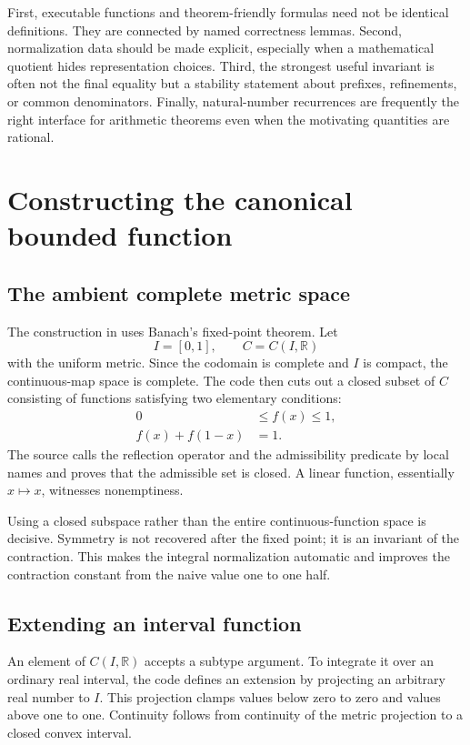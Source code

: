 \documentclass[11pt,oneside]{report}
\theoremstyle{definition}
\theoremstyle{remark}
\DeclareRobustCommand{\file}[1]{\texorpdfstring{\texttt{\expandafter\seqsplit\expandafter{\detokenize{#1}}}}{\detokenize{#1}}}
\newcommand{\R}{\mathbb{R}}
\begin{document}
First, executable functions and theorem-friendly formulas need not be identical definitions.  They are connected by named correctness lemmas.  Second, normalization data should be made explicit, especially when a mathematical quotient hides representation choices.  Third, the strongest useful invariant is often not the final equality but a stability statement about prefixes, refinements, or common denominators.  Finally, natural-number recurrences are frequently the right interface for arithmetic theorems even when the motivating quantities are rational.

\chapter{Constructing the canonical bounded function}\label{ch:existence}

\section{The ambient complete metric space}
The construction in \file{Existence.lean} uses Banach's fixed-point theorem.  Let
\[
  I=[0,1],
  \qquad
  C=C(I,\R)
\]
with the uniform metric.  Since the codomain is complete and \(I\) is compact, the continuous-map space is complete.  The code then cuts out a closed subset of \(C\) consisting of functions satisfying two elementary conditions:
\begin{align*}
  0&\leq f(x)\leq1,\\
  f(x)+f(1-x)&=1.
\end{align*}
The source calls the reflection operator and the admissibility predicate by local names and proves that the admissible set is closed.  A linear function, essentially \(x\mapsto x\), witnesses nonemptiness.

Using a closed subspace rather than the entire continuous-function space is decisive.  Symmetry is not recovered after the fixed point; it is an invariant of the contraction.  This makes the integral normalization automatic and improves the contraction constant from the naive value one to one half.

\section{Extending an interval function}
An element of \(C(I,\R)\) accepts a subtype argument.  To integrate it over an ordinary real interval, the code defines an extension by projecting an arbitrary real number to \(I\).  This projection clamps values below zero to zero and values above one to one.  Continuity follows from continuity of the metric projection to a closed convex interval.
\end{document}
